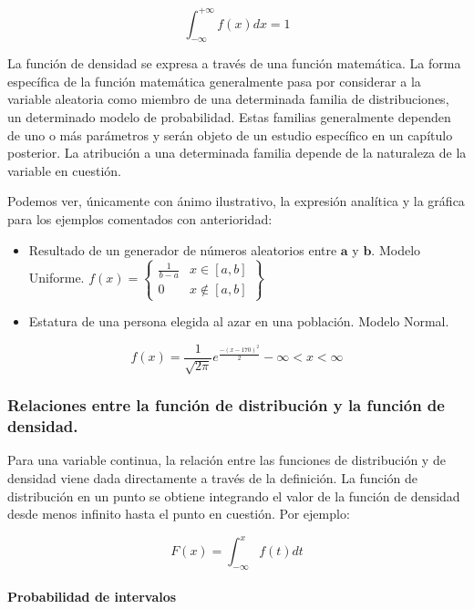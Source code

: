 \documentclass[
]{article}
\providecommand{\tightlist}{%
  \setlength{\itemsep}{0pt}\setlength{\parskip}{0pt}}
\begin{document}
\[
\int_{-\infty}^{+\infty} f(x) d x=1
\]

La función de densidad se expresa a través de una función matemática. La
forma específica de la función matemática generalmente pasa por
considerar a la variable aleatoria como miembro de una determinada
familia de distribuciones, un determinado modelo de probabilidad. Estas
familias generalmente dependen de uno o más parámetros y serán objeto de
un estudio específico en un capítulo posterior. La atribución a una
determinada familia depende de la naturaleza de la variable en cuestión.

Podemos ver, únicamente con ánimo ilustrativo, la expresión analítica y
la gráfica para los ejemplos comentados con anterioridad:

\begin{itemize}
\tightlist
\item
  Resultado de un generador de números aleatorios entre
  \(\boldsymbol{a}\) y \(\boldsymbol{b}\). Modelo Uniforme.
  \(f(x)=\left\{\begin{array}{cc}\frac{1}{b-a} & x \in[a, b] \\ 0 & x \notin[a, b]\end{array}\right\}\)
\item
  Estatura de una persona elegida al azar en una población. Modelo
  Normal.
\end{itemize}

\[
f(x)=\frac{1}{\sqrt{2 \pi}} e^{\frac{-(x-170)^{2}}{2}}-\infty<x<\infty
\]

\subsubsection{Relaciones entre la función de distribución y la función de densidad.}\label{relaciones-entre-la-funciuxf3n-de-distribuciuxf3n-y-la-funciuxf3n-de-densidad.}

Para una variable continua, la relación entre las funciones de
distribución y de densidad viene dada directamente a través de la
definición. La función de distribución en un punto se obtiene integrando
el valor de la función de densidad desde menos infinito hasta el punto
en cuestión. Por ejemplo:

\[
F(x)=\int_{-\infty}^{x} f(t) d t
\]

\paragraph{Probabilidad de intervalos}\label{probabilidad-de-intervalos}
\end{document}
